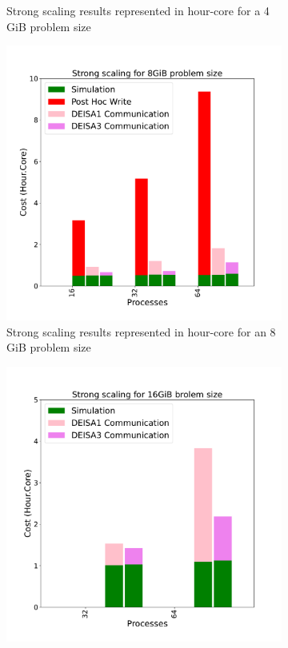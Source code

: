 \begin{figure}[h]
\begin{subfigure}[b]{0.4\textwidth}
         \caption{Strong scaling results represented in hour-core for a 4\,GiB problem size}
         \label{fig:D4}
     \end{subfigure}
     \vfill
     \begin{subfigure}[b]{0.4\textwidth}
         \centering
         \includegraphics[width=\textwidth, height=\textwidth]{figures/D8_1vs3vspost1vspost2.pdf}
         \caption{Strong scaling results represented in hour-core for an 8\,GiB problem size}
         \label{fig:D8}
     \end{subfigure}
     \hfill
     \begin{subfigure}[b]{0.4\textwidth}
         \centering
         \includegraphics[width=\textwidth, height=\textwidth]{figures/D16_1vs3vspost1vspost2.pdf}

\end{subfigure}
\end{figure}
